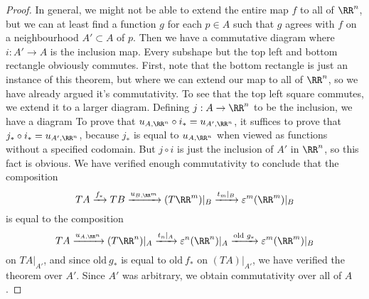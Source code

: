 \begin{proof}
    In general, we might not be able to extend the entire map $f$ to all of $\RR^n$, but we can at least find a function $g$ for each $p \in A$ such that $g$ agrees with $f$ on a neighbourhood $A' \subset A$ of $p$. Then we have a commutative diagram
    where $i: A' \to A$ is the inclusion map. Every subshape but the top left and bottom rectangle obviously commutes. First, note that the bottom rectangle is just an instance of this theorem, but where we can extend our map to all of $\RR^n$, so we have already argued it's commutativity. To see that the top left square commutes, we extend it to a larger diagram. Defining $j: A \to \RR^n$ to be the inclusion, we have a diagram
    To prove that $u_{A,\RR^n} \circ i_* = u_{A',\RR^n}$, it suffices to prove that $j_* \circ i_* = u_{A', \RR^n}$, because $j_*$ is equal to $u_{A,\RR^n}$ when viewed as functions without a specified codomain. But $j \circ i$ is just the inclusion of $A'$ in $\RR^n$, so this fact is obvious. We have verified enough commutativity to conclude that the composition
    \[ TA \xrightarrow{f_*} TB \xrightarrow{u_{B,\RR^m}} (T\RR^m)|_B \xrightarrow{t_m|_B} \varepsilon^m(\RR^m)|_B \]
    is equal to the composition
    \[ TA \xrightarrow{u_{A,\RR^n}} (T\RR^n)|_A \xrightarrow{t_n|_A} \varepsilon^n(\RR^n)|_A \xrightarrow{\text{old\ $g_*$}} \varepsilon^m(\RR^m)|_B \]
    on $TA|_{A'}$, and since $\text{old}\ g_*$ is equal to $\text{old}\ f_*$ on $(TA)|_{A'}$, we have verified the theorem over $A'$. Since $A'$ was arbitrary, we obtain commutativity over all of $A$.
\end{proof}

